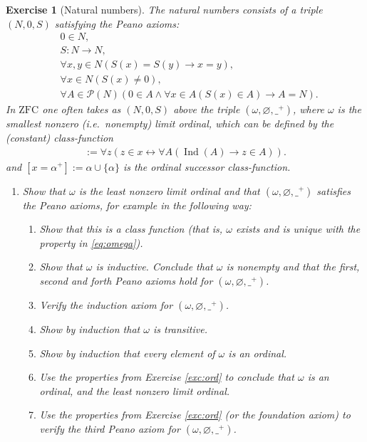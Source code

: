 \documentclass{scrartcl}
\theoremstyle{definition}
\theoremstyle{plain}
\theoremstyle{remark}
\newcommand{\ZFC}{\ensuremath{\mathrm{ZFC}}}
\newcommand{\limp}{\rightarrow}
\newcommand{\liff}{\leftrightarrow}
\newcommand{\Pow}{\mathcal{P}}
\newcommand{\eqdef}{:=}
\DeclareMathOperator{\Ind}{Ind}
\theoremstyle{plain}
\newtheorem{Exc}{Exercise}
\begin{document}
\begin{Exc}[Natural numbers\label{exc:nat}]
  The natural numbers consists of a triple $(N,0,S)$ satisfying the Peano axioms:
  \begin{align*}
    &0 \in N\mbox{,}\\
    &S : N \longrightarrow N\mbox{,}\\
    &\forall x, y \in N (S(x) = S(y) \rightarrow x = y)\mbox{,}\\
    &\forall x \in N (S(x) \not= 0)\mbox{,}\\
    &\forall A \in \Pow(N) (0 \in A \land \forall x \in A (S(x) \in A) \limp A = N)\mbox{.}
  \end{align*}
  In $\ZFC$ one often takes as $(N,0,S)$ above the triple $(\omega,\varnothing,\_^+)$, where $\omega$ is the smallest nonzero (i.e.~nonempty) limit ordinal, which can be defined by the (constant) class-function
  \begin{align}
    [x = \omega] \eqdef \forall z (z \in x \liff \forall A (\Ind(A) \limp z \in A))\text{.}\label{eq:omega}
  \end{align}
  and $[x = \alpha^+] \eqdef \alpha \cup \{\alpha\}$ is the ordinal successor class-function.
  \begin{enumerate}
  \item Show that $\omega$ is the least nonzero limit ordinal and that $(\omega,\varnothing,\_^+)$ satisfies the Peano axioms, for example in the following way:
    \begin{enumerate}
    \item Show that this is a class function (that is, $\omega$ exists and is unique with the property in \eqref{eq:omega}).
    \item Show that $\omega$ is inductive. Conclude that $\omega$ is nonempty and that the first, second and forth Peano axioms hold for $(\omega,\varnothing,\_^+)$.
    \item Verify the induction axiom for $(\omega,\varnothing,\_^+)$.
    \item Show by induction that $\omega$ is transitive.
    \item Show by induction that every element of $\omega$ is an ordinal.
    \item Use the properties from Exercise \ref{exc:ord} to conclude that $\omega$ is an ordinal, and the least nonzero limit ordinal.
    \item Use the properties from Exercise \ref{exc:ord} (or the foundation axiom) to verify the third Peano axiom for $(\omega,\varnothing,\_^+)$.

\end{enumerate}
\end{enumerate}
\end{Exc}
\end{document}
